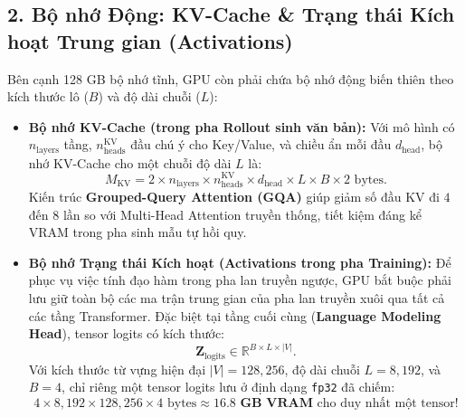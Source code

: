 \subsection{2. Bộ nhớ Động: KV-Cache \& Trạng thái Kích hoạt Trung gian (Activations)}
Bên cạnh 128 GB bộ nhớ tĩnh, GPU còn phải chứa bộ nhớ động biến thiên theo kích thước lô ($B$) và độ dài chuỗi ($L$):
\begin{itemize}[leftmargin=1.2cm]
    \item \textbf{Bộ nhớ KV-Cache (trong pha Rollout sinh văn bản):}
    Với mô hình có $n_{\text{layers}}$ tầng, $n_{\text{heads}}^{\text{KV}}$ đầu chú ý cho Key/Value, và chiều ẩn mỗi đầu $d_{\text{head}}$, bộ nhớ KV-Cache cho một chuỗi độ dài $L$ là:
    \begin{equation}
        M_{\text{KV}} = 2 \times n_{\text{layers}} \times n_{\text{heads}}^{\text{KV}} \times d_{\text{head}} \times L \times B \times 2\text{ bytes}.
        \label{eq:kv_cache_mem}
    \end{equation}
    Kiến trúc \textbf{Grouped-Query Attention (GQA)} giúp giảm số đầu KV đi $4$ đến $8$ lần so với Multi-Head Attention truyền thống, tiết kiệm đáng kể VRAM trong pha sinh mẫu tự hồi quy.
    \item \textbf{Bộ nhớ Trạng thái Kích hoạt (Activations trong pha Training):}
    Để phục vụ việc tính đạo hàm trong pha lan truyền ngược, GPU bắt buộc phải lưu giữ toàn bộ các ma trận trung gian của pha lan truyền xuôi qua tất cả các tầng Transformer.
    Đặc biệt tại tầng cuối cùng (\textbf{Language Modeling Head}), tensor logits có kích thước:
    \begin{equation}
        \mathbf{Z}_{\text{logits}} \in \mathbb{R}^{B \times L \times |V|}.
    \end{equation}
    Với kích thước từ vựng hiện đại $|V| = 128,256$, độ dài chuỗi $L = 8,192$, và $B = 4$, chỉ riêng một tensor logits lưu ở định dạng \texttt{fp32} đã chiếm:
    \begin{equation}
        4 \times 8,192 \times 128,256 \times 4\text{ bytes} \approx \mathbf{16.8\text{ GB VRAM}} \text{ cho duy nhất một tensor}!
    \end{equation}
\end{itemize}

